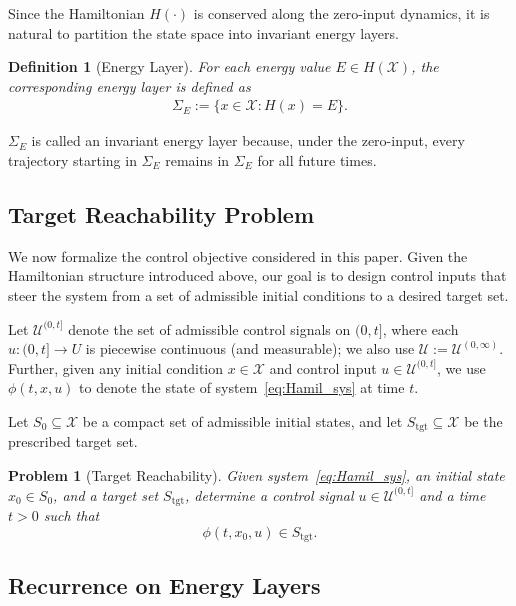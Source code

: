 \documentclass[letterpaper, 10 pt, conference]{ieeeconf}
\newtheorem{definition}{Definition}
\newtheorem{problem}{Problem}
\newcommand{\tgt}{\mathrm{tgt}}
\begin{document}
Since the Hamiltonian $H(\cdot)$ is conserved along the zero-input dynamics, it is natural to partition the state space into invariant energy layers.

\begin{definition}[Energy Layer]
For each energy value $E \in H(\mathcal X)$, the corresponding energy layer is defined as
\begin{align*}
\Sigma_E := \{x \in \mathcal X : H(x)=E\}.
\end{align*}
\end{definition}

$\Sigma_E$ is called an invariant energy layer because, under the zero-input, every trajectory starting in $\Sigma_E$ remains in $\Sigma_E$ for all future times.

\subsection{Target Reachability Problem}

We now formalize the control objective considered in this paper. Given the Hamiltonian structure introduced above, our goal is to design control inputs that steer the system from a set of admissible initial conditions to a desired target set.

Let $\mathcal{U}^{(0,t]}$ denote the set of admissible control signals on $(0,t]$, where each $u:(0,t]\to U$ is piecewise continuous (and measurable); we also use $\mathcal{U}:=\mathcal{U}^{(0,\infty)}$.
Further, given any initial condition $x\in\mathcal{X}$ and control input $u\in \mathcal{U}^{(0,t]}$, we use $\phi(t,x,u)$ to denote the state of system~\eqref{eq:Hamil_sys} at time $t$.


Let $S_0 \subseteq \mathcal{X}$ be a compact set of admissible initial states, and let $S_{\tgt} \subseteq \mathcal{X}$ be the prescribed target set.

\begin{problem}[Target Reachability]\label{prob:target reachability}
Given system~\eqref{eq:Hamil_sys}, an initial state $x_0 \in S_0$, and a target set $S_{\tgt}$, determine a control signal $u \in \mathcal{U}^{(0,t]}$ and a time $t>0$ such that
\[
\phi(t,x_0,u) \in S_{\tgt}.
\]
\end{problem}

\subsection{Recurrence on Energy Layers}
\label{sec:recurrence_on_energy_layers}
\end{document}
